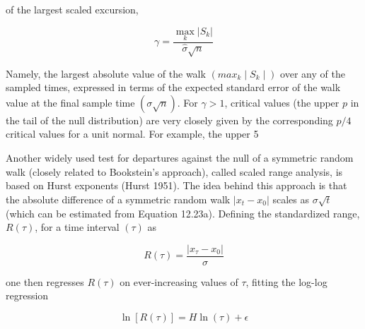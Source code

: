 \documentclass{article}
\begin{document}
of the largest scaled excursion,

\begin{equation}
\gamma=\frac{\max_{k}\left|S_{k}\right|}{\widehat{\sigma}\sqrt{n}}
\tag{12.23b}
\label{eq:12_23b}
\end{equation}

Namely, the largest absolute value of the walk  $ (max_k \mid S_k \mid) $ over any of the sampled times, expressed in terms of the expected standard error of the walk value at the final sample time  $ (\sigma \sqrt{n}) $. For  $ \gamma > 1 $, critical values (the upper  $ p $ in the tail of the null distribution) are very closely given by the corresponding  $ p/4 $ critical values for a unit normal. For example, the upper 5%

Another widely used test for departures against the null of a symmetric random walk (closely related to Bookstein's approach), called scaled range analysis, is based on Hurst exponents (Hurst 1951). The idea behind this approach is that the absolute difference of a symmetric random walk  $ |x_t - x_0| $ scales as  $ \sigma \sqrt{t} $ (which can be estimated from Equation 12.23a). Defining the standardized range,  $ R(\tau) $, for a time interval  $ (\tau) $ as

\begin{equation}
R(\tau)=\frac{\left|x_{\tau}-x_{0}\right|}{\sigma}
\tag{12.24a}
\label{eq:12_24a}
\end{equation}

one then regresses  $ R(\tau) $ on ever-increasing values of  $ \tau $, fitting the log-log regression

\begin{equation}
\ln[R(\tau)]=H\ln(\tau)+\epsilon
\tag{12.24b}
\label{eq:12_24b}
\end{equation}
\end{document}
